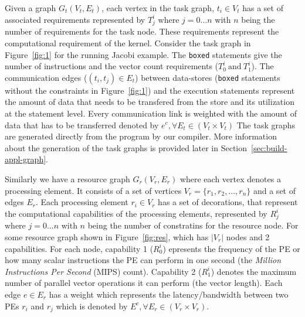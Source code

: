 \documentclass[10pt, conference, compsocconf]{IEEEtran}
\begin{document}
Given a graph $G_t(V_t, E_t)$, each vertex in the task graph, $t_i \in
V_t$ has a set of associated requirements represented by $T^{i}_{j}$
where $j=0...n$ with $n$ being the number of requirements for the task
node. These requirements represent the computational requirement of the
kernel. Consider the task graph in Figure~\ref{fig:1} for the running
Jacobi example. The \texttt{boxed} statements give the number of
instructions and the vector count requirements ($T^i_0\ \mathrm{and}\
T^i_1$). The communication edges ($(t_i, t_j) \in E_t$) between
data-stores (\texttt{boxed} statements without the constraints in
Figure~\ref{fig:1}) and the execution statements represent the amount of
data that needs to be transfered from the store and its utilization at
the statement level. Every communication link is weighted with the
amount of data that has to be transferred denoted by $e^c, \forall E_t
\in (V_t \times V_t)$ The task graphs are generated directly from the
program by our compiler. More information about the generation of the
task graphs is provided later in Section~\ref{sec:build-appl-graph}.


Similarly we have a resource graph $G_r(V_r, E_r)$ where each vertex
denotes a processing element. It consists of a set of vertices $V_r =
\{r_1, r_2, ... , r_n\}$ and a set of edges $E_r$. Each processing
element $r_i \in V_r$ has a set of decorations, that represent the
computational capabilities of the processing elements, represented by
$R^{i}_{j}$ where $j=0...n$ with $n$ being the number of constratins for
the resource node. For some resource graph shown in
Figure~\ref{fig:res}, which has $|V_r|$ nodes and 2 capabilities. For
each node, capability 1 ($R^i_0$) epresents the frequency of the PE or
how many scalar instructions the PE can perform in one second (the
\textit{Million Instructions Per Second} (MIPS) count). Capability 2
($R^i_1$) denotes the maximum number of parallel vector operations it
can perform (the vector length). Each edge $e \in E_r$ has a weight
which represents the latency/bandwidth between two PEs $r_i$ and $r_j$
which is denoted by $E^c, \forall E_r \in (V_r \times V_r)$.

\end{document}
